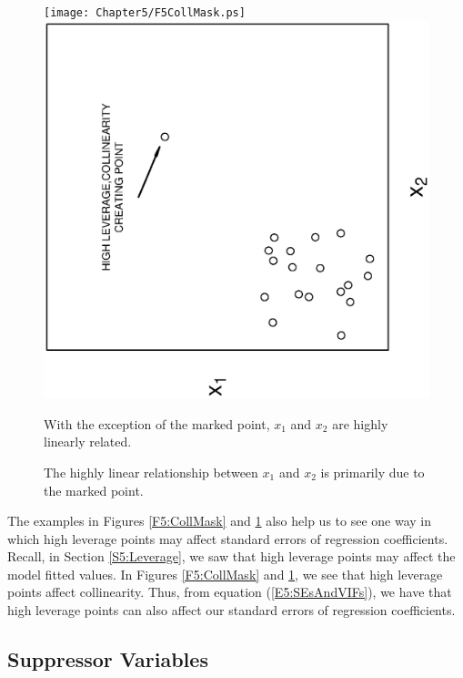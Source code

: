\begin{figure}[htp]
    \texttt{[image: Chapter5/F5CollMask.ps]}
    $~~~~~~$
    \includegraphics[width=1\textwidth,angle=270,scale=0.45]{Chapter5/F5CollInduce.ps}    \hfill
      \parbox[t]{2.5in}{\caption{\label{F5:CollMask} \small  With the exception of
the marked point, $x_1$ and $x_2$ are highly linearly related.}}
\hfill
        \parbox[t]{2.5in}{ \caption{\label{F5:CollInduce} \small  The highly linear relationship
between $x_1$ and $x_2$ is primarily due to the marked point.}}
\end{figure}


The examples in Figures \ref{F5:CollMask} and \ref{F5:CollInduce}
also help us to see one way in which high leverage points may affect
standard errors of regression coefficients. Recall, in Section
\ref{S5:Leverage}, we saw that high leverage points may affect the
model fitted values. In Figures \ref{F5:CollMask} and
\ref{F5:CollInduce}, we see that high leverage points affect
collinearity. Thus, from equation (\ref{E5:SEsAndVIFs}), we have
that high leverage points can also affect our standard errors of
regression coefficients.

\subsection{Suppressor Variables}\label{S5:Suppressor}

